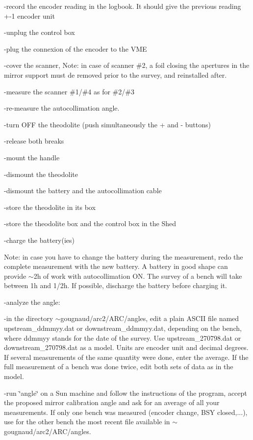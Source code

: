 -record the encoder reading in the logbook. It should give the previous reading
+-1 encoder unit 

-unplug the control box 

-plug the connexion of the encoder to the VME 

-cover the scanner, Note: in case of scanner \#2, a foil closing the apertures
in the mirror support must de removed prior to the survey, and reinstalled after.

-measure the scanner \#1/\#4 as for \#2/\#3

-re-measure the autocollimation angle.

-turn OFF the theodolite (push simultaneously the + and - buttons) 

-release both breaks 

-mount the handle 

-dismount the theodolite 

-dismount the battery and the autocollimation cable 

-store the theodolite in its box 

-store the theodolite box and the control box in the Shed 

-charge the battery(ies)

Note: in case you have to change the battery during the measurement, redo the
complete measurement with the new battery. A battery in good shape can provide
\( \sim  \)2h of work with autocollimation ON. The survey of
a bench will take between 1h and 1/2h. If possible, discharge the battery before
charging it.

-analyze the angle: 

-in the directory \( \sim  \)gougnaud/arc2/ARC/angles, edit a plain ASCII file
named upstream\_ddmmyy.dat or downstream\_ddmmyy.dat, depending on the bench,
where ddmmyy stands for the date of the survey. Use upstream\_270798.dat or
downstream\_270798.dat as a model. Units are encoder unit and decimal degrees.
If several measurements of the same quantity were done, enter the average. If
the full measurement of a bench was done twice, edit both sets of data as in
the model. 

-run \char`\"{}angle\char`\"{} on a Sun machine and follow the instructions
of the program, accept the proposed mirror calibration angle and ask for an
average of all your measurements. If only one bench was measured (encoder change,
BSY closed,...), use for the other bench the most recent file available in \( \sim  \)gougnaud/arc2/ARC/angles. 


